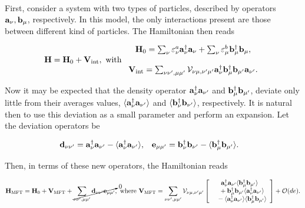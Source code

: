 \documentclass{homework}
\begin{document}
\blanky \\

First, consider a system with two types of particles, described by operators ${\bf a}_\nu, {\bf b}_{\mu}$, respectively. In this model, the only interactions present are those between different kind of particles. The Hamiltonian then reads

\begin{equation}
    {\bf H} = {\bf H}_0 + {\bf V}_{\textnormal{int}}, \textnormal{ with } \begin{array}{c}
         {\bf H}_0 = \sum_{\nu} \varepsilon_{\nu}^a {\bf a}_\nu^\dagger {\bf a}_\nu + \sum_{\nu} \varepsilon_{\mu}^b{\bf b}_\mu^\dagger {\bf b}_\mu,  \\
         \\
         {\bf V}_{\textnormal{int}}  = \sum_{\nu\nu', \mu\mu'} {\mathcal V}_{\nu\mu, \nu'\mu'} {\bf a}^\dagger_{\nu} {\bf b}_{\mu}^\dagger {\bf b}_{\mu'} {\bf a}_{\nu'}.
    \end{array}
\end{equation}

Now it may be expected that the density operator ${\bf a}_{\nu}^\dagger {\bf a}_{\nu'}$ and ${\bf b}_{\mu}^\dagger {\bf b}_{\mu'}$, deviate only little from their averages values, $ \langle {\bf a}_{\nu}^\dagger {\bf a}_{\nu'} \rangle$ and  $ \langle {\bf b}_{\nu}^\dagger {\bf b}_{\nu'} \rangle$, respectively. It is natural then to use this deviation as a small parameter and perform an expansion. Let the deviation operators be 

\begin{align}
    {\bf d}_{\nu \nu'} &= {\bf a}_{\nu}^\dagger {\bf a}_{\nu'} - \langle {\bf a}_{\nu}^\dagger {\bf a}_{\nu'} \rangle, & {\bf e}_{\mu \mu'} &= {\bf b}_{\nu}^\dagger {\bf b}_{\nu'} - \langle {\bf b}_{\mu}^\dagger {\bf b}_{\mu'} \rangle.
\end{align}

Then, in terms of these new operators, the Hamiltonian reads

\begin{equation*}
    {\bf H}_{\textnormal{MFT}}  = {\bf H}_0 + {\bf V}_{\textnormal{MFT}} + \cancelto{0}{\sum_{\nu\nu', \mu\mu'} {\bf d}_{\nu \nu'} {\bf e}_{\mu \mu'}}, \textnormal{ where } {\bf V}_{\textnormal{MFT}} = \sum_{\nu\nu', \mu\mu'} {\mathcal V}_{\nu\mu, \nu'\mu'} \left[\begin{array}{c}
         {\bf a}_{\nu}^\dagger {\bf a}_{\nu'} \langle {\bf b}_{\mu}^\dagger {\bf b}_{\mu'} \rangle \\
         \textnormal{ } \textnormal{ } + {\bf b}_{\mu}^\dagger {\bf b}_{\mu'} \langle {\bf a}_{\nu}^\dagger {\bf a}_{\nu'} \rangle \\
         \textnormal{ } \textnormal{ } - \langle {\bf a}_{\nu}^\dagger {\bf a}_{\nu'} \rangle \langle {\bf b}_{\mu}^\dagger {\bf b}_{\mu'} \rangle  
    \end{array} \right] + \mathcal{O}(d e).
\end{equation*}
\end{document}
